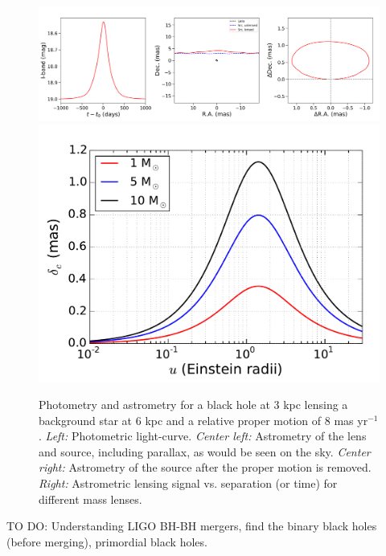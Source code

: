 \documentclass[11pt]{article}
\begin{document}
\begin{figure}
    \centering
    \includegraphics[scale=0.27]{phot_astrom.png}
    \includegraphics[scale=0.22]{MassTrend.pdf}
    \caption{Photometry and astrometry for a black hole at 3 kpc lensing a background star at 6 kpc and a relative proper motion of 8 mas yr$^{−1}$. {\em Left:} Photometric light-curve. {\em Center left:} Astrometry of the lens and source, including parallax, as would be seen on the sky. {\em Center right:} Astrometry of the source after the proper motion is removed. {\em Right:} Astrometric lensing signal vs. separation (or time) for different mass lenses.}
    \label{fig:astrom_lens}
\end{figure}

TO DO: Understanding LIGO BH-BH mergers, find the binary black holes (before merging), primordial black holes. 
\end{document}
